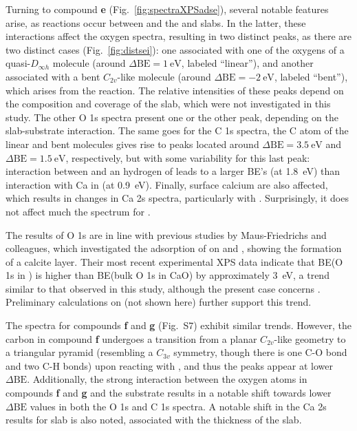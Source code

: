 \documentclass[%
aip,
amsmath,amssymb,
preprint,%
jcp,
showkeys,
]{revtex4-2}
\def\dbe{\ensuremath{\Delta\text{BE}}}
\begin{document}
Turning to compound \textbf{e} (Fig.~\ref{fig:spectraXPSadse}), several notable features arise, as reactions occur between  and the  and  slabs. In the latter, these interactions affect the oxygen spectra, resulting in two distinct peaks, as there are two distinct cases (Fig.~\ref{fig:distsei}): one associated with one of the oxygens of a quasi-$D_{\infty h}$  molecule  (around $\dbe = \SI{1}{\electronvolt}$, labeled ``linear''), and another associated with a bent $C_{2v}$-like  molecule (around $\dbe = \SI{-2}{\electronvolt}$, labeled ``bent''), which arises from the reaction. The relative intensities of these peaks depend on the composition and coverage of the slab, which were not investigated in this study.\cite{dahleSituPreparationCalcium2012,fujimoriInteractionWaterCaO2016a} The other O 1s spectra present one or the other peak, depending on the slab-substrate interaction. The same goes for the C 1s spectra, the C atom of the linear and bent  molecules gives rise to peaks located around $\dbe = \SI{3.5}{\electronvolt}$ and $\dbe = \SI{1.5}{\electronvolt}$, respectively, but with some variability for this last peak: interaction between  and an hydrogen of  leads to a larger BE's (at \SI{1.8}{\electronvolt}) than interaction with Ca in  (at \SI{0.9}{\electronvolt}). Finally, surface calcium are also affected, which results in changes in Ca 2s spectra, particularly with . Surprisingly, it does not affect much the spectrum for .

The results of O 1s are in line with previous studies by Maus-Friedrichs and colleagues\cite{ochsCO2ChemisorptionCa1998,voigtsAdsorptionCO2CO2009,dahleSituPreparationCalcium2012}, which investigated the adsorption of  on  and , showing the formation of a calcite layer. Their most recent experimental XPS data\cite{dahleSituPreparationCalcium2012} indicate that BE(O 1s in ) is higher than BE(bulk O 1s in CaO) by approximately \SI{3}{\electronvolt}, a trend similar to that observed in this study, although the present case concerns . Preliminary calculations on  (not shown here) further support this trend. 

The spectra for compounds \textbf{f} and \textbf{g} (Fig.~S7) exhibit similar trends. However, the carbon in compound \textbf{f} undergoes a transition from a planar $C_{2v}$-like geometry to a triangular pyramid (resembling a $C_{3v}$ symmetry, though there is one C-O bond and two C-H bonds) upon reacting with , and thus the peaks appear at lower \dbe{}. Additionally, the strong interaction between the oxygen atoms in compounds \textbf{f} and \textbf{g} and the  substrate results in a notable shift towards lower \dbe{} values in both the O 1s and C 1s spectra.  A notable shift in the Ca 2s results for  slab is also noted, associated with the thickness of the slab.
\end{document}
